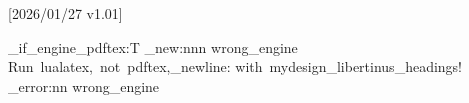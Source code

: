 
[2026/01/27 v1.01]


%
%


 
\sys_if_engine_pdftex:T  
	{ 
	   	  \msg_new:nnn  { \ClassName } { wrong_engine } { Run~lualatex,~not~pdftex,\iow_newline: with~mydesign_libertinus_headings!}
		  \msg_error:nn { \ClassName } { wrong_engine }
	}




\usepackage[dvipsnames,svgnames,x11names]{xcolor}




\AtBeginDocument{
    \hypersetup{
    	linkcolor=Blue3,
    	citecolor=Blue3,
    	urlcolor=violet,
    	filecolor=red, 
    	}
    \ifmit@lineno
	    \renewcommand{\linenumberfont}{\sffamily\mdseries\tiny\color{violet}}%
	\fi
}


